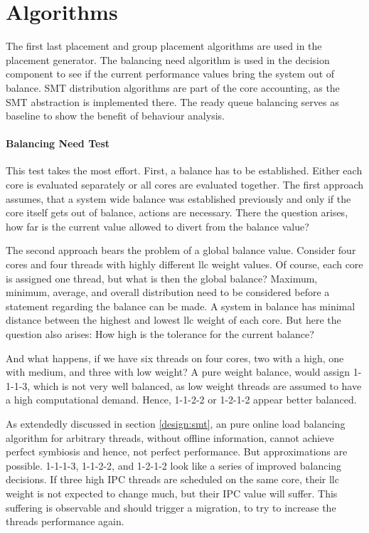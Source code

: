 \section{Algorithms}
\label{impl:algos}

The first last placement and group placement algorithms are used in the
placement generator.
The balancing need algorithm is used in the decision component to see if the
current performance values bring the system out of balance.
SMT distribution algorithms are part of the core accounting, as the SMT
abstraction is implemented there.
The ready queue balancing serves as baseline to show the benefit of behaviour
analysis.

\paragraph{Balancing Need Test}
This test takes the most effort.
First, a balance has to be established.
Either each core is evaluated separately or all cores are evaluated together.
The first approach assumes, that a system wide balance was established
previously and only if the core itself gets out of balance, actions are
necessary.
There the question arises, how far is the current value allowed to divert from
the balance value?

The second approach bears the problem of a global balance value.
Consider four cores and four threads with highly different \gls{llc} weight
values.
Of course, each core is assigned one thread, but what is then the global
balance?
Maximum, minimum, average, and overall distribution need to be considered
before a statement regarding the balance can be made.
A system in balance has minimal distance between the highest and lowest
\gls{llc} weight of each core.
But here the question also arises: How high is the tolerance for the current
balance?

And what happens, if we have six threads on four cores, two with a high,
one with medium, and three with low weight?
A pure weight balance, would assign 1-1-1-3, which is not very well balanced,
as low weight threads are assumed to have a high computational demand.
Hence, 1-1-2-2 or 1-2-1-2 appear better balanced.

As extendedly discussed in section \ref{design:smt}, an pure online load
balancing algorithm for arbitrary threads, without offline information, cannot
achieve perfect symbiosis and hence, not perfect performance.
But approximations are possible.
1-1-1-3, 1-1-2-2, and 1-2-1-2 look like a series of improved balancing
decisions.
If three high IPC threads are scheduled on the same core, their \gls{llc}
weight is not expected to change much, but their IPC value will suffer.
This suffering is observable and should trigger a migration, to try to increase
the threads performance again.

